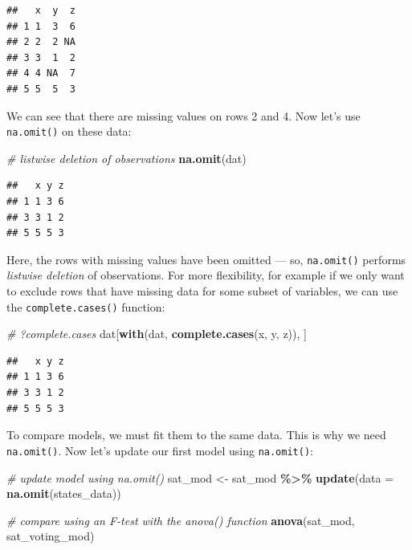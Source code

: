 \documentclass[
]{book}
\newenvironment{Shaded}{\begin{snugshade}}{\end{snugshade}}
\newcommand{\CommentTok}[1]{\textcolor[rgb]{0.56,0.35,0.01}{\textit{#1}}}
\newcommand{\DataTypeTok}[1]{\textcolor[rgb]{0.13,0.29,0.53}{#1}}
\newcommand{\KeywordTok}[1]{\textcolor[rgb]{0.13,0.29,0.53}{\textbf{#1}}}
\newcommand{\NormalTok}[1]{#1}
\newcommand{\OperatorTok}[1]{\textcolor[rgb]{0.81,0.36,0.00}{\textbf{#1}}}
\newcommand{\StringTok}[1]{\textcolor[rgb]{0.31,0.60,0.02}{#1}}
\begin{document}
\begin{verbatim}
##   x  y  z
## 1 1  3  6
## 2 2  2 NA
## 3 3  1  2
## 4 4 NA  7
## 5 5  5  3
\end{verbatim}

We can see that there are missing values on rows 2 and 4. Now let's use \texttt{na.omit()} on these data:

\begin{Shaded}
\begin{Highlighting}[]
  \CommentTok{\# listwise deletion of observations}
  \KeywordTok{na.omit}\NormalTok{(dat) }
\end{Highlighting}
\end{Shaded}

\begin{verbatim}
##   x y z
## 1 1 3 6
## 3 3 1 2
## 5 5 5 3
\end{verbatim}

Here, the rows with missing values have been omitted --- so, \texttt{na.omit()} performs \emph{listwise deletion} of observations. For more flexibility, for example if we only want to exclude rows that have missing data for some subset of variables, we can use the \texttt{complete.cases()} function:

\begin{Shaded}
\begin{Highlighting}[]
  \CommentTok{\# ?complete.cases}
\NormalTok{  dat[}\KeywordTok{with}\NormalTok{(dat, }\KeywordTok{complete.cases}\NormalTok{(x, y, z)), ]}
\end{Highlighting}
\end{Shaded}

\begin{verbatim}
##   x y z
## 1 1 3 6
## 3 3 1 2
## 5 5 5 3
\end{verbatim}

To compare models, we must fit them to the same data. This is why we need \texttt{na.omit()}. Now let's update our first model using \texttt{na.omit()}:

\begin{Shaded}
\begin{Highlighting}[]
  \CommentTok{\# update model using \textasciigrave{}na.omit()\textasciigrave{}}
\NormalTok{  sat\_mod \textless{}{-}}\StringTok{ }
\StringTok{      }\NormalTok{sat\_mod }\OperatorTok{\%\textgreater{}\%}
\StringTok{      }\KeywordTok{update}\NormalTok{(}\DataTypeTok{data =} \KeywordTok{na.omit}\NormalTok{(states\_data))}

  \CommentTok{\# compare using an F{-}test with the anova() function}
  \KeywordTok{anova}\NormalTok{(sat\_mod, sat\_voting\_mod)}
\end{Highlighting}
\end{Shaded}
\end{document}
